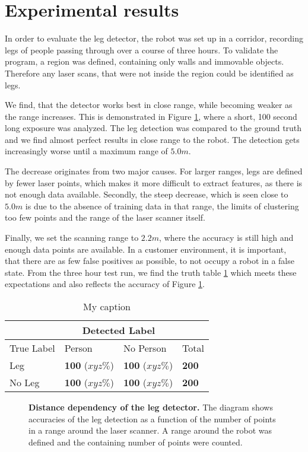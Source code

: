 \section{Experimental results}

In order to evaluate the leg detector, the robot was set up in a corridor, recording legs of people passing through over a course of three hours. To validate the program, a region was defined, containing only walls and immovable objects. Therefore any laser scans, that were not inside the region could be identified as legs.

We find, that the detector works best in close range, while becoming weaker as the range increases. This is demonstrated in Figure \ref{fig:radius_detection}, where a short, 100 second long exposure was analyzed. The leg detection was compared to the ground truth and we find almost perfect results in close range to the robot. The detection gets increasingly worse until a maximum range of $5.0 m$.

The decrease originates from two major causes. For larger ranges, legs are defined by fewer laser points, which makes it more difficult to extract features, as there is not enough data available. Secondly, the steep decrease, which is seen close to $5.0 m$ is due to the absence of training data in that range, the limits of clustering too few points and the range of the laser scanner itself.

Finally, we set the scanning range to $2.2 m$, where the accuracy is still high and enough data points are available. In a customer environment, it is important, that there are as few false positives as possible, to not occupy a robot in a false state. From the three hour test run, we find the truth table \ref{tab:truth} which meets these expectations and also reflects the accuracy of Figure \ref{fig:radius_detection}.

\begin{table}[]
	\label{tab:truth}
	\centering
	\caption{My caption}
	\begin{tabular}{|l|l|l|l|}
	\hline
	 & \multicolumn{2}{c}{Detected Label} &  \\ \hline
	 True Label & Person & No Person & Total \\ \hline
	 Leg & \textbf{100} ($xyz \%$) & \textbf{100} ($xyz \%$) & \textbf{200} \\
	 No Leg & \textbf{100} ($xyz \%$) & \textbf{100} ($xyz \%$) & \textbf{200} \\ \hline
	\end{tabular}
\end{table}

\begin{figure}
	\label{fig:radius_detection}
		\normalsize
		\begin{center}
			
		\end{center}
		\caption{\textbf{Distance dependency of the leg detector.} The diagram shows accuracies of the leg detection as a function of the number of points in a range around the laser scanner. A range around the robot was defined and the containing number of points were counted.}
\end{figure}